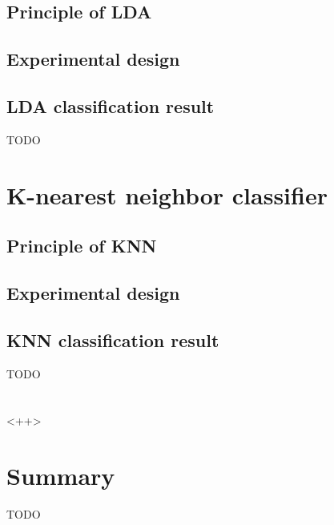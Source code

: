 \subsection{Principle of LDA}
\subsection{Experimental design}
\subsection{LDA classification result}

TODO

\section{K-nearest neighbor classifier}

\subsection{Principle of KNN}
\subsection{Experimental design}
\subsection{KNN classification result}
TODO

\section{}<++>

\section{Summary}

TODO
